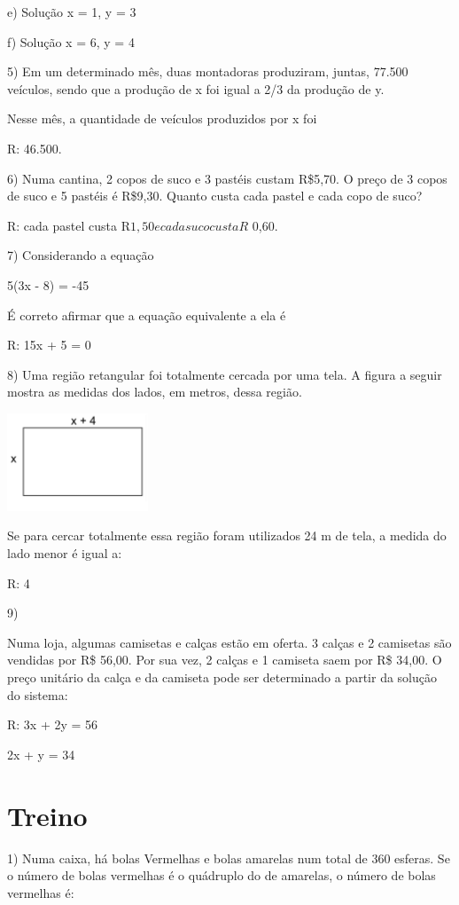 e) Solução x = 1, y = 3

f) Solução x = 6, y = 4

5) Em um determinado mês, duas montadoras produziram, juntas, 77.500
veículos, sendo que a produção de x foi igual a 2/3 da produção de y.

Nesse mês, a quantidade de veículos produzidos por x foi

R: 46.500.

6) Numa cantina, 2 copos de suco e 3 pastéis custam R\$5,70. O preço de
3 copos de suco e 5 pastéis é R\$9,30. Quanto custa cada pastel e cada
copo de suco?

R: cada pastel custa R\(1,50 e cada suco custa R\) 0,60.

7) Considerando a equação

5(3x - 8) = -45

É correto afirmar que a equação equivalente a ela é

R: 15x + 5 = 0

8) Uma região retangular foi totalmente cercada por uma tela. A figura a
seguir mostra as medidas dos lados, em metros, dessa região.

\includegraphics[width=1.65625in,height=1.14583in]{./imgSAEB_6_MAT/media/image38.png}

Se para cercar totalmente essa região foram utilizados 24 m de tela, a
medida do lado menor é igual a:

R: 4

9)

Numa loja, algumas camisetas e calças estão em oferta. 3 calças e 2
camisetas são vendidas por R\$ 56,00. Por sua vez, 2 calças e 1 camiseta
saem por R\$ 34,00. O preço unitário da calça e da camiseta pode ser
determinado a partir da solução do sistema:

R: 3x + 2y = 56

2x + y = 34

\section{Treino}

1) Numa caixa, há bolas Vermelhas e bolas amarelas num total de 360
esferas. Se o número de bolas vermelhas é o quádruplo do de amarelas, o
número de bolas vermelhas é:

